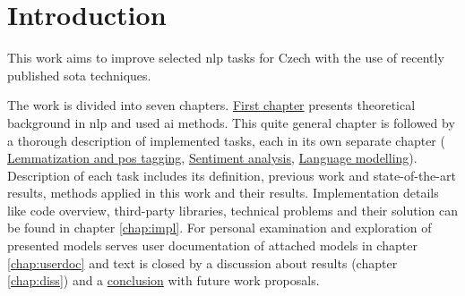 \chapter*{Introduction}
This work aims to improve selected \acrfull{nlp} tasks for Czech with the use of recently published \acrfull{sota} techniques. 
 
\par

\par
The work is divided into seven chapters. \hyperref[chap:theandme]{First chapter} presents theoretical background in \acrshort{nlp} and used \acrfull{ai} methods. This quite general chapter is followed by a thorough description of implemented tasks, each in its own separate chapter ( \hyperref[chap:tag]{Lemmatization and \acrlong{pos} tagging},  \hyperref[chap:sent]{Sentiment analysis},  \hyperref[chap:mod]{Language modelling}). Description of each task includes its definition, previous work and state-of-the-art results, methods applied in this work and their results. Implementation details like code overview, third-party libraries, technical problems and their solution can be found in chapter \ref{chap:impl}.
For personal examination and exploration of presented models serves user documentation of attached models in chapter \ref{chap:userdoc} and text is closed by a discussion about results (chapter \ref{chap:diss}) and a \hyperref[chap:concl]{conclusion} with future work proposals.


